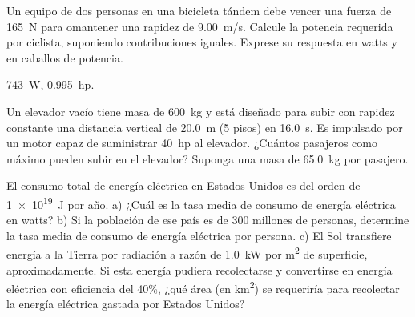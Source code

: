 \documentclass[11pt]{article}
\begin{document}
\begin{multicols}{2}
\begin{exercise}
    Un equipo de dos personas en una bicicleta tándem debe vencer una fuerza de \qty{165}{N} para omantener una rapidez de \qty{9.00}{m/s}. Calcule la potencia requerida por ciclista, suponiendo contribuciones iguales. Exprese su respuesta en watts y en caballos de potencia.
\end{exercise}
\begin{solution}
    \qty{743}{W}, \qty{0.995}{hp}.
\end{solution}
\end{multicols}

\begin{exercise}
    Un elevador vacío tiene masa de \qty{600}{kg} y está diseñado para subir con rapidez constante una distancia vertical de \qty{20.0}{m} (5 pisos) en \qty{16.0}{s}. Es impulsado por un motor capaz de suministrar \qty{40}{hp} al elevador. ¿Cuántos pasajeros como máximo pueden subir en el elevador? Suponga una masa de \qty{65.0}{kg} por pasajero.
\end{exercise}

\begin{exercise}
    El consumo total de energía eléctrica en Estados Unidos es del orden de \qty{1e19}{J} por año. a) ¿Cuál es la tasa media de consumo de energía eléctrica en watts? b) Si la población de ese país es de 300 millones de personas, determine la tasa media de consumo de energía eléctrica por persona. c) El Sol transfiere energía a la Tierra por radiación a razón de \qty{1.0}{kW} por \unit{m^2} de superficie, aproximadamente. Si esta energía pudiera recolectarse y convertirse en energía eléctrica con eficiencia del 40\%, ¿qué área (en \unit{km^2}) se requeriría para recolectar la energía eléctrica gastada por Estados Unidos?
\end{exercise}
\end{document}
